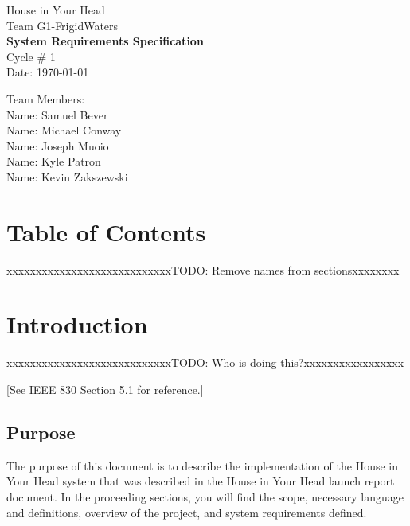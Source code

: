 \documentclass{article}
\begin{document}
\begin{titlepage}
    \begin{center}
        \begin{huge}
        House in Your Head \\[1cm]
        Team G1-FrigidWaters \\[2.2cm]
        { \bfseries System Requirements Specification } \\[1cm]
        Cycle \# 1\\[2.2cm]
        Date: \required\today\\[1cm]
        \end{huge}
    \end{center}
    \null \vfill
    \begin{large}
        Team Members: \\[0.5cm]
        Name: Samuel Bever\\[0.5cm]
        Name: Michael Conway\\[0.5cm]
        Name: Joseph Muoio\\[0.5cm]
        Name: Kyle Patron\\[0.5cm]
        Name: Kevin Zakszewski
    \end{large}
\end{titlepage}

\section*{\centering Table of Contents}
\makeatletter
{}
\makeatother
\newpage


{\color{red}xxxxxxxxxxxxxxxxxxxxxxxxxxxxTODO: Remove names from sectionsxxxxxxxx}
\section{Introduction}
{\color{red}xxxxxxxxxxxxxxxxxxxxxxxxxxxxTODO: Who is doing this?xxxxxxxxxxxxxxxxx}

[See IEEE 830 Section 5.1 for reference.]

\subsection{Purpose}
The purpose of this document is to describe the implementation of the House in Your Head system that 
was described in the House in Your Head launch report document. In the proceeding sections, you will 
find the scope, necessary language and definitions, overview of the project, and system requirements 
defined.
\end{document}
